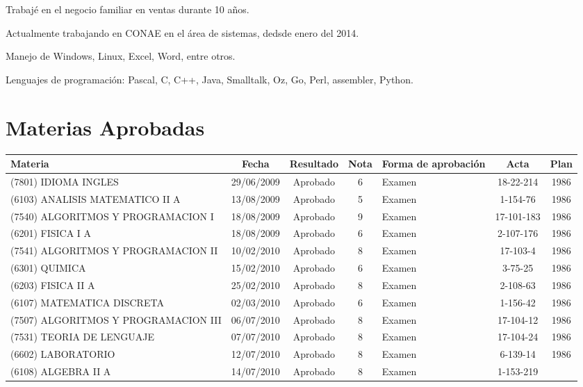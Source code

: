 \documentclass[a4paper,10pt]{article}
\begin{document}
Trabajé en el negocio familiar en ventas durante 10 años.

Actualmente trabajando en CONAE en el área de sistemas, dedsde enero del 2014.

Manejo de Windows, Linux, Excel, Word, entre otros.

Lenguajes de programación: Pascal, C, C++, Java, Smalltalk, Oz, Go, Perl,
assembler, Python.

\newpage
	\section{Materias Aprobadas}	
	\begin{center}
		\scriptsize
		\centering
		\begin{longtable}{|p{3.5cm}|c|c|c|p{1.4cm}|c|c|}
			\hline 
			\bfseries Materia & \bfseries Fecha & \bfseries Resultado & 
			\bfseries Nota & \bfseries Forma de aprobación & \bfseries Acta & 
		 	\bfseries	Plan \\
			\hline
			(7801) IDIOMA INGLES & 29/06/2009 & Aprobado & 6 & Examen & 
			18-22-214 & 1986 \\
			\hline
			(6103) ANALISIS MATEMATICO II A & 13/08/2009 & Aprobado & 5 & Examen
			& 1-154-76 & 1986 \\
			\hline
			(7540) ALGORITMOS Y PROGRAMACION I & 18/08/2009 & Aprobado & 9 & 
			Examen & 17-101-183 & 1986 \\
			\hline
			(6201) FISICA I A & 18/08/2009 & Aprobado & 6 & Examen & 2-107-176 &
			1986 \\
			\hline
			(7541) ALGORITMOS Y PROGRAMACION II & 10/02/2010 & Aprobado & 8 & 
			Examen & 17-103-4 & 1986 \\
			\hline
			(6301) QUIMICA & 15/02/2010 & Aprobado & 6 & Examen & 3-75-25 & 1986
			\\
			\hline
			(6203) FISICA II A & 25/02/2010 & Aprobado & 8 & Examen & 2-108-63 &
			1986 \\
			\hline
			(6107) MATEMATICA DISCRETA & 02/03/2010 & Aprobado & 6 & Examen & 
			1-156-42 & 1986 \\
			\hline
			(7507) ALGORITMOS Y PROGRAMACION III & 06/07/2010 & Aprobado & 8 & 
			Examen & 17-104-12 & 1986 \\
			\hline
			(7531) TEORIA DE LENGUAJE & 07/07/2010 & Aprobado & 8 & Examen & 
			17-104-24 & 1986 \\
			\hline
			(6602) LABORATORIO & 12/07/2010 & Aprobado & 8 & Examen & 6-139-14 &
			1986 \\
			\hline
			(6108) ALGEBRA II A & 14/07/2010 & Aprobado & 8 & Examen & 1-153-219

\end{longtable}
\end{center}
\end{document}
